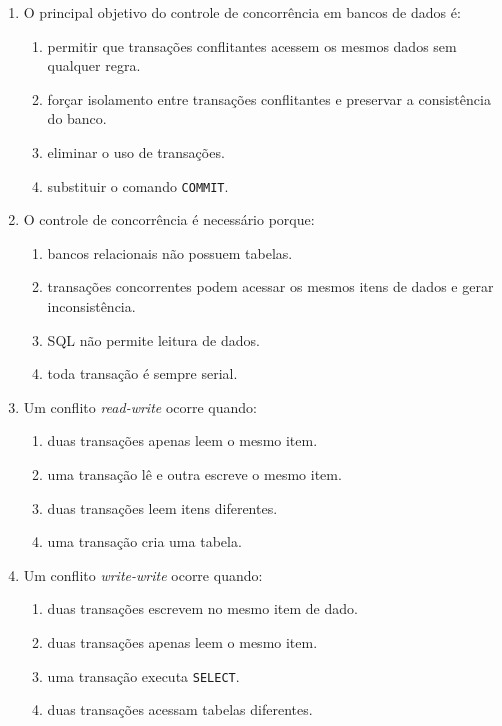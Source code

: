 \documentclass[12pt,a4paper]{article}
\begin{document}
\begin{enumerate}[label=\textbf{Q\arabic*.}]

\item O principal objetivo do controle de concorrência em bancos de dados é:

\begin{enumerate}[label=\alph*)]
    \item permitir que transações conflitantes acessem os mesmos dados sem qualquer regra.
    \item forçar isolamento entre transações conflitantes e preservar a consistência do banco.
    \item eliminar o uso de transações.
    \item substituir o comando \texttt{COMMIT}.
\end{enumerate}

\item O controle de concorrência é necessário porque:

\begin{enumerate}[label=\alph*)]
    \item bancos relacionais não possuem tabelas.
    \item transações concorrentes podem acessar os mesmos itens de dados e gerar inconsistência.
    \item SQL não permite leitura de dados.
    \item toda transação é sempre serial.
\end{enumerate}

\item Um conflito \textit{read-write} ocorre quando:

\begin{enumerate}[label=\alph*)]
    \item duas transações apenas leem o mesmo item.
    \item uma transação lê e outra escreve o mesmo item.
    \item duas transações leem itens diferentes.
    \item uma transação cria uma tabela.
\end{enumerate}

\item Um conflito \textit{write-write} ocorre quando:

\begin{enumerate}[label=\alph*)]
    \item duas transações escrevem no mesmo item de dado.
    \item duas transações apenas leem o mesmo item.
    \item uma transação executa \texttt{SELECT}.
    \item duas transações acessam tabelas diferentes.
\end{enumerate}


\end{enumerate}
\end{document}

